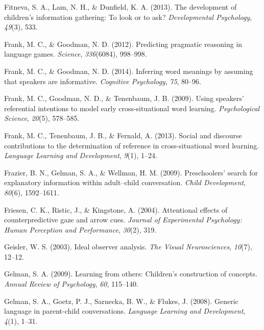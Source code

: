 \documentclass[oneside]{report}
\begin{document}
\leavevmode\hypertarget{ref-fitneva2013development}{}%
Fitneva, S. A., Lam, N. H., \& Dunfield, K. A. (2013). The development
of children's information gathering: To look or to ask?
\emph{Developmental Psychology}, \emph{49}(3), 533.

\leavevmode\hypertarget{ref-frank2012predicting}{}%
Frank, M. C., \& Goodman, N. D. (2012). Predicting pragmatic reasoning
in language games. \emph{Science}, \emph{336}(6084), 998--998.

\leavevmode\hypertarget{ref-frank2014inferring}{}%
Frank, M. C., \& Goodman, N. D. (2014). Inferring word meanings by
assuming that speakers are informative. \emph{Cognitive Psychology},
\emph{75}, 80--96.

\leavevmode\hypertarget{ref-frank2009using}{}%
Frank, M. C., Goodman, N. D., \& Tenenbaum, J. B. (2009). Using
speakers' referential intentions to model early cross-situational word
learning. \emph{Psychological Science}, \emph{20}(5), 578--585.

\leavevmode\hypertarget{ref-frank2013social}{}%
Frank, M. C., Tenenbaum, J. B., \& Fernald, A. (2013). Social and
discourse contributions to the determination of reference in
cross-situational word learning. \emph{Language Learning and
Development}, \emph{9}(1), 1--24.

\leavevmode\hypertarget{ref-frazier2009preschoolers}{}%
Frazier, B. N., Gelman, S. A., \& Wellman, H. M. (2009). Preschoolers'
search for explanatory information within adult--child conversation.
\emph{Child Development}, \emph{80}(6), 1592--1611.

\leavevmode\hypertarget{ref-friesen2004attentional}{}%
Friesen, C. K., Ristic, J., \& Kingstone, A. (2004). Attentional effects
of counterpredictive gaze and arrow cues. \emph{Journal of Experimental
Psychology: Human Perception and Performance}, \emph{30}(2), 319.

\leavevmode\hypertarget{ref-geisler2003ideal}{}%
Geisler, W. S. (2003). Ideal observer analysis. \emph{The Visual
Neurosciences}, \emph{10}(7), 12--12.

\leavevmode\hypertarget{ref-gelman2009learning}{}%
Gelman, S. A. (2009). Learning from others: Children's construction of
concepts. \emph{Annual Review of Psychology}, \emph{60}, 115--140.

\leavevmode\hypertarget{ref-gelman2008generic}{}%
Gelman, S. A., Goetz, P. J., Sarnecka, B. W., \& Flukes, J. (2008).
Generic language in parent-child conversations. \emph{Language Learning
and Development}, \emph{4}(1), 1--31.
\end{document}
